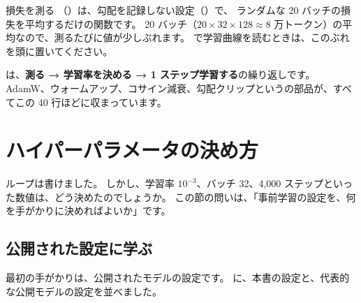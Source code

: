 
損失を測る （）は、勾配を記録しない設定（）で、
ランダムな 20 バッチの損失を平均するだけの関数です。
20 バッチ（$20\times32\times128\approx 8$ 万トークン）の平均なので、測るたびに値が少しぶれます。
で学習曲線を読むときは、このぶれを頭に置いてください。

 は、\textbf{測る → 学習率を決める → 1 ステップ学習する}の繰り返しです。
AdamW、ウォームアップ、コサイン減衰、勾配クリップというの部品が、すべてこの 40 行ほどに収まっています。

\section{ハイパーパラメータの決め方}\label{sec:pt-hparams}

ループは書けました。
しかし、学習率 $10^{-3}$、バッチ 32、4,000 ステップといった数値は、どう決めたのでしょうか。
この節の問いは、「事前学習の設定を、何を手がかりに決めればよいか」です。

\subsection{公開された設定に学ぶ}

最初の手がかりは、公開されたモデルの設定です。
に、本書の設定と、代表的な公開モデルの設定を並べました。

